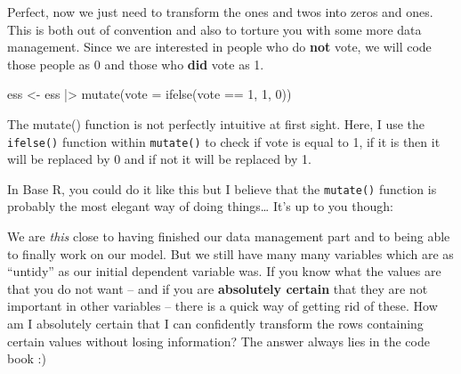 \documentclass[
  letterpaper,
  DIV=11,
  numbers=noendperiod]{scrreprt}
\newenvironment{Shaded}{\begin{snugshade}}{\end{snugshade}}
\newcommand{\AttributeTok}[1]{\textcolor[rgb]{0.40,0.45,0.13}{#1}}
\newcommand{\CommentTok}[1]{\textcolor[rgb]{0.37,0.37,0.37}{#1}}
\newcommand{\DecValTok}[1]{\textcolor[rgb]{0.68,0.00,0.00}{#1}}
\newcommand{\FunctionTok}[1]{\textcolor[rgb]{0.28,0.35,0.67}{#1}}
\newcommand{\NormalTok}[1]{\textcolor[rgb]{0.00,0.23,0.31}{#1}}
\newcommand{\OtherTok}[1]{\textcolor[rgb]{0.00,0.23,0.31}{#1}}
\newcommand{\SpecialCharTok}[1]{\textcolor[rgb]{0.37,0.37,0.37}{#1}}
\begin{document}
Perfect, now we just need to transform the ones and twos into zeros and
ones. This is both out of convention and also to torture you with some
more data management. Since we are interested in people who do
\textbf{not} vote, we will code those people as 0 and those who
\textbf{did} vote as 1.

\begin{Shaded}
\begin{Highlighting}[]
\NormalTok{ess }\OtherTok{\textless{}{-}}\NormalTok{ ess }\SpecialCharTok{|\textgreater{}} 
  \FunctionTok{mutate}\NormalTok{(}\AttributeTok{vote =} \FunctionTok{ifelse}\NormalTok{(vote }\SpecialCharTok{==} \DecValTok{1}\NormalTok{, }\DecValTok{1}\NormalTok{, }\DecValTok{0}\NormalTok{))}
\end{Highlighting}
\end{Shaded}

The mutate() function is not perfectly intuitive at first sight. Here, I
use the \texttt{ifelse()} function within \texttt{mutate()} to check if
vote is equal to 1, if it is then it will be replaced by 0 and if not it
will be replaced by 1.

In Base R, you could do it like this but I believe that the
\texttt{mutate()} function is probably the most elegant way of doing
things\ldots{} It's up to you though:

\begin{Shaded}
\end{Shaded}

We are \emph{this} close to having finished our data management part and
to being able to finally work on our model. But we still have many many
variables which are as ``untidy'' as our initial dependent variable was.
If you know what the values are that you do not want -- and if you are
\textbf{absolutely certain} that they are not important in other
variables -- there is a quick way of getting rid of these. How am I
absolutely certain that I can confidently transform the rows containing
certain values without losing information? The answer always lies in the
code book :)
\end{document}
